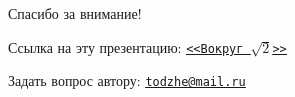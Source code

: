 \documentclass[11pt]{beamer}
\newcommand\fram[2]{\begin{frame}{\bf #1} #2 \end{frame}}
\newcommand{\myref}[2]{\href{#1}{\texttt{\underline{#2}}}}
\begin{document}
\section{ }
\fram{}{
\begin{center}
    \large{Спасибо за внимание!}
    \vspace{1cm}
    
    Ссылка на эту презентацию: \myref{https://drive.google.com/drive/folders/1607sCtSGdzMDJGXJMD0tXNaMEeiO7db7?usp=sharing}{<<Вокруг $\sqrt{2}$>>}
    \vspace{1cm}
    
    Задать вопрос автору:
    \myref{mailto:todzhe@mail.ru}{todzhe@mail.ru}
\end{center}
}
\end{document}
